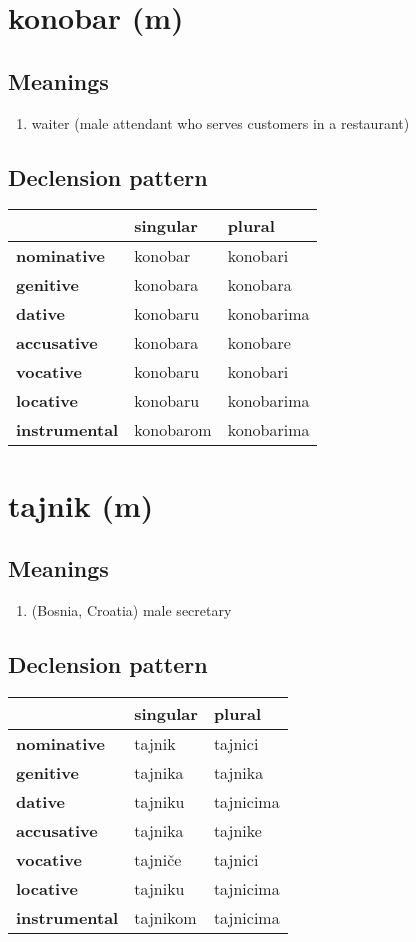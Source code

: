 \filbreak
\section{konobar (m)}
\subsection*{Meanings}
\begin{enumerate}
\item waiter (male attendant who serves customers in a restaurant)
\end{enumerate}
\subsection*{Declension pattern}
\begin{tabularx}{\linewidth}{Xll}
\toprule
{} &   singular &      plural \\
\midrule
\textbf{nominative  } &    konobar &    konobari \\
\textbf{genitive    } &   konobara &    konobara \\
\textbf{dative      } &   konobaru &  konobarima \\
\textbf{accusative  } &   konobara &    konobare \\
\textbf{vocative    } &   konobaru &    konobari \\
\textbf{locative    } &   konobaru &  konobarima \\
\textbf{instrumental} &  konobarom &  konobarima \\
\bottomrule
\end{tabularx}

\filbreak
\section{tajnik (m)}
\subsection*{Meanings}
\begin{enumerate}
\item (Bosnia, Croatia) male secretary
\end{enumerate}
\subsection*{Declension pattern}
\begin{tabularx}{\linewidth}{Xll}
\toprule
{} &  singular &     plural \\
\midrule
\textbf{nominative  } &    tajnik &    tajnici \\
\textbf{genitive    } &   tajnika &    tajnika \\
\textbf{dative      } &   tajniku &  tajnicima \\
\textbf{accusative  } &   tajnika &    tajnike \\
\textbf{vocative    } &   tajniče &    tajnici \\
\textbf{locative    } &   tajniku &  tajnicima \\
\textbf{instrumental} &  tajnikom &  tajnicima \\
\bottomrule
\end{tabularx}

